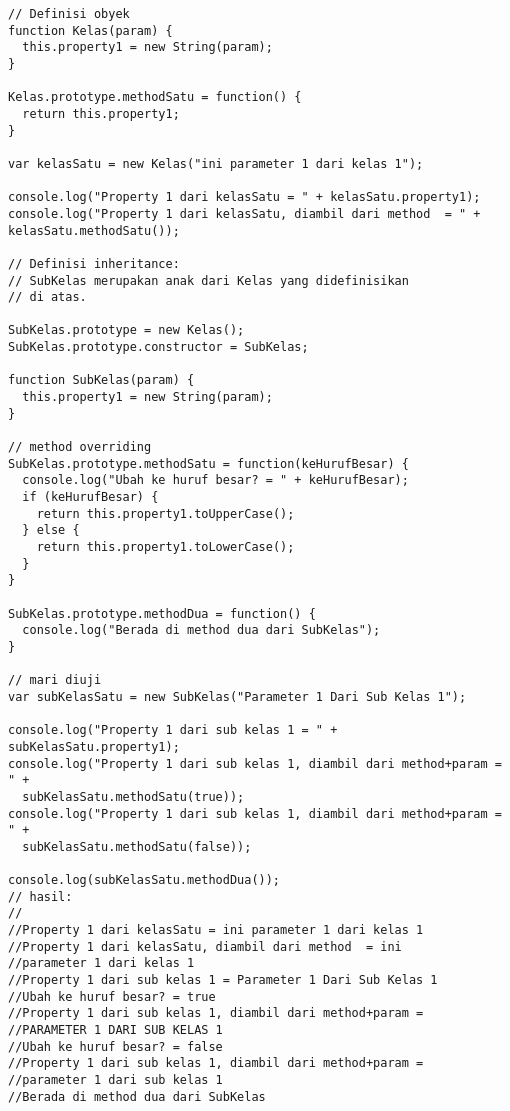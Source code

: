 \lstset{language=JavaScript,caption=Pewarisan di PBO JavaScript}
\begin{lstlisting}
// Definisi obyek
function Kelas(param) {
  this.property1 = new String(param);
}

Kelas.prototype.methodSatu = function() {
  return this.property1; 
}

var kelasSatu = new Kelas("ini parameter 1 dari kelas 1");

console.log("Property 1 dari kelasSatu = " + kelasSatu.property1);
console.log("Property 1 dari kelasSatu, diambil dari method  = " + kelasSatu.methodSatu());

// Definisi inheritance:
// SubKelas merupakan anak dari Kelas yang didefinisikan
// di atas.

SubKelas.prototype = new Kelas();
SubKelas.prototype.constructor = SubKelas;

function SubKelas(param) {
  this.property1 = new String(param);
}

// method overriding
SubKelas.prototype.methodSatu = function(keHurufBesar) {
  console.log("Ubah ke huruf besar? = " + keHurufBesar);
  if (keHurufBesar) {
    return this.property1.toUpperCase();
  } else {
    return this.property1.toLowerCase();
  }
}

SubKelas.prototype.methodDua = function() {
  console.log("Berada di method dua dari SubKelas");
}

// mari diuji
var subKelasSatu = new SubKelas("Parameter 1 Dari Sub Kelas 1");

console.log("Property 1 dari sub kelas 1 = " + subKelasSatu.property1);
console.log("Property 1 dari sub kelas 1, diambil dari method+param = " + 
  subKelasSatu.methodSatu(true));
console.log("Property 1 dari sub kelas 1, diambil dari method+param = " +
  subKelasSatu.methodSatu(false));

console.log(subKelasSatu.methodDua());
// hasil:
//
//Property 1 dari kelasSatu = ini parameter 1 dari kelas 1
//Property 1 dari kelasSatu, diambil dari method  = ini 
//parameter 1 dari kelas 1
//Property 1 dari sub kelas 1 = Parameter 1 Dari Sub Kelas 1
//Ubah ke huruf besar? = true
//Property 1 dari sub kelas 1, diambil dari method+param = 
//PARAMETER 1 DARI SUB KELAS 1
//Ubah ke huruf besar? = false
//Property 1 dari sub kelas 1, diambil dari method+param = 
//parameter 1 dari sub kelas 1
//Berada di method dua dari SubKelas
\end{lstlisting}
